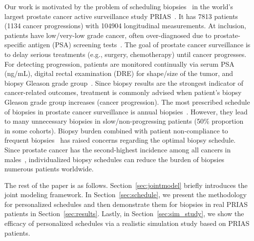 Our work is motivated by the problem of scheduling biopsies~\citep{nieboer2018active} in the world's largest prostate cancer active surveillance study PRIAS~\citep{bokhorst2015compliance}. It has 7813 patients (1134 cancer progressions) with 104904 longitudinal measurements. At inclusion, patients have low/very-low grade cancer, often over-diagnosed due to prostate-specific antigen (PSA) screening tests~\citep{crawford2003epidemiology}. The goal of prostate cancer surveillance is to delay serious treatments (e.g., surgery, chemotherapy) until cancer progresses. For detecting progression, patients are monitored continually via serum PSA (ng/mL), digital rectal examination (DRE) for shape/size of the tumor, and biopsy Gleason grade group~\citep{epsteinGG2014}. Since biopsy results are the strongest indicator of cancer-related outcomes, treatment is commonly advised when patient's biopsy Gleason grade group increases (cancer progression). The most prescribed schedule of biopsies in prostate cancer surveillance is annual biopsies~\citep{loeb2014heterogeneity}. However, they lead to many unnecessary biopsies in slow/non-progressing patients (50\% proportion in some cohorts). Biopsy burden combined with patient non-compliance to frequent biopsies~\citep{bokhorst2015compliance} has raised concerns regarding the optimal biopsy schedule. Since prostate cancer has the second-highest incidence among all cancers in males~\citep{GlobalCancerStats2012}, individualized biopsy schedules can reduce the burden of biopsies numerous patients worldwide.

The rest of the paper is as follows. Section~\ref{sec:jointmodel} briefly introduces the joint modeling framework. In Section~\ref{sec:schedule}, we present the methodology for personalized schedules and then demonstrate them for biopsies in real PRIAS patients in Section~\ref{sec:results}. Lastly, in Section~\ref{sec:sim_study}, we show the efficacy of personalized schedules via a realistic simulation study based on PRIAS patients.